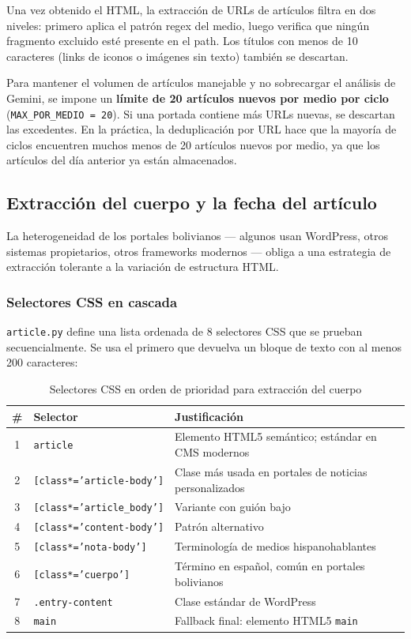 \documentclass[12pt,a4paper]{article}
\begin{document}
Una vez obtenido el HTML, la extracción de URLs de artículos filtra en dos niveles: primero aplica el patrón regex del medio, luego verifica que ningún fragmento excluido esté presente en el path. Los títulos con menos de 10 caracteres (links de iconos o imágenes sin texto) también se descartan.

Para mantener el volumen de artículos manejable y no sobrecargar el análisis de Gemini, se impone un \textbf{límite de 20 artículos nuevos por medio por ciclo} (\texttt{MAX\_POR\_MEDIO = 20}). Si una portada contiene más URLs nuevas, se descartan las excedentes. En la práctica, la deduplicación por URL hace que la mayoría de ciclos encuentren muchos menos de 20 artículos nuevos por medio, ya que los artículos del día anterior ya están almacenados.

\subsection{Extracción del cuerpo y la fecha del artículo}

La heterogeneidad de los portales bolivianos --- algunos usan WordPress, otros sistemas propietarios, otros frameworks modernos --- obliga a una estrategia de extracción tolerante a la variación de estructura HTML.

\subsubsection{Selectores CSS en cascada}

\texttt{article.py} define una lista ordenada de 8 selectores CSS que se prueban secuencialmente. Se usa el primero que devuelva un bloque de texto con al menos 200 caracteres:

\begin{table}[H]
\centering
\caption{Selectores CSS en orden de prioridad para extracción del cuerpo}
\begin{tabular}{@{}clp{7cm}@{}}
\toprule
\rowcolor{azulAS!15}
\textbf{\#} & \textbf{Selector} & \textbf{Justificación} \\
\midrule
1 & \texttt{article} & Elemento HTML5 semántico; estándar en CMS modernos \\
\rowcolor{grisCelda}
2 & \texttt{[class*='article-body']} & Clase más usada en portales de noticias personalizados \\
3 & \texttt{[class*='article\_body']} & Variante con guión bajo \\
\rowcolor{grisCelda}
4 & \texttt{[class*='content-body']} & Patrón alternativo \\
5 & \texttt{[class*='nota-body']} & Terminología de medios hispanohablantes \\
\rowcolor{grisCelda}
6 & \texttt{[class*='cuerpo']} & Término en español, común en portales bolivianos \\
7 & \texttt{.entry-content} & Clase estándar de WordPress \\
\rowcolor{grisCelda}
8 & \texttt{main} & Fallback final: elemento HTML5 \texttt{main} \\
\bottomrule
\end{tabular}
\end{table}
\end{document}
